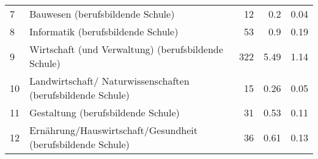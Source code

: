 \begin{longtable}{lXrrr}
     7 &
     \multicolumn{1}{X}{ Bauwesen (berufsbildende Schule)   } &


       \num{12} &
       \num[round-mode=places,round-precision=2]{0.2} &
         \num[round-mode=places,round-precision=2]{0.04} \\

     8 &
     \multicolumn{1}{X}{ Informatik (berufsbildende Schule)   } &


       \num{53} &
       \num[round-mode=places,round-precision=2]{0.9} &
         \num[round-mode=places,round-precision=2]{0.19} \\

     9 &
     \multicolumn{1}{X}{ Wirtschaft (und Verwaltung) (berufsbildende Schule)   } &


       \num{322} &
       \num[round-mode=places,round-precision=2]{5.49} &
         \num[round-mode=places,round-precision=2]{1.14} \\

     10 &
     \multicolumn{1}{X}{ Landwirtschaft/ Naturwissenschaften (berufsbildende Schule)   } &


       \num{15} &
       \num[round-mode=places,round-precision=2]{0.26} &
         \num[round-mode=places,round-precision=2]{0.05} \\

     11 &
     \multicolumn{1}{X}{ Gestaltung (berufsbildende Schule)   } &


       \num{31} &
       \num[round-mode=places,round-precision=2]{0.53} &
         \num[round-mode=places,round-precision=2]{0.11} \\

     12 &
     \multicolumn{1}{X}{ Ernährung/Hauswirtschaft/Gesundheit (berufsbildende Schule)   } &


       \num{36} &
       \num[round-mode=places,round-precision=2]{0.61} &
         \num[round-mode=places,round-precision=2]{0.13} \\


\end{longtable}
